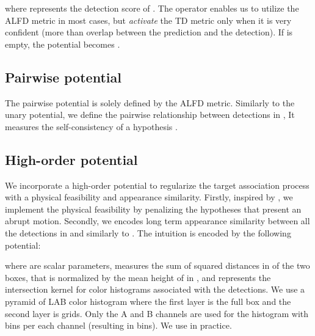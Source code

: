 \documentclass[10pt,twocolumn,letterpaper]{article}
\begin{document}
{\footnotesize

}
where  represents the detection score of . The  operator enables us to utilize the ALFD metric in most cases, but \emph{activate} the TD metric only when it is very confident (more than  overlap between the prediction and the detection). If  is empty, the potential becomes .

\subsection{Pairwise potential}
\label{sec:pairwise}

The pairwise potential  is solely defined by the ALFD metric. Similarly to the unary potential, we define the pairwise relationship between detections in , 
{\footnotesize
}
It measures the self-consistency of a hypothesis .

\subsection{High-order potential}
\label{sec:targethorder}
We incorporate a high-order potential to regularize the target association process with a physical feasibility and appearance similarity.
Firstly, inspired by \cite{Andriyenko:2012:DCO,ZamirECCV12}, we implement the physical feasibility by penalizing the hypotheses that present an abrupt motion. Secondly, we encodes long term appearance similarity between all the detections in  and  similarly to \cite{ZamirECCV12}. The intuition is encoded by the following potential:

{\scriptsize
}
where  are scalar parameters,  measures the sum of squared distances in  of the two boxes, that is normalized by the mean height of  in , and  represents the intersection kernel for color histograms associated with the detections. We use a pyramid of LAB color histogram where the first layer is the full box and the second layer is  grids. Only the A and B channels are used for the histogram with  bins per each channel (resulting in  bins). We use  in practice. 
\end{document}
